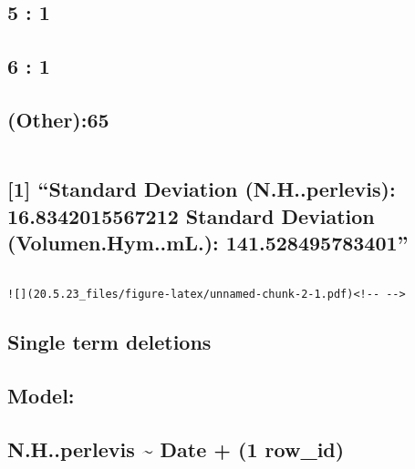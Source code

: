 \documentclass[
]{article}
\begin{document}
\hypertarget{section-3}{%
\subsection{5 : 1}\label{section-3}}

\hypertarget{section-4}{%
\subsection{6 : 1}\label{section-4}}

\hypertarget{other65}{%
\subsection{(Other):65}\label{other65}}

\begin{verbatim}
\end{verbatim}

\hypertarget{standard-deviation-n.h..perlevis-16.8342015567212-standard-deviation-volumen.hym..ml.-141.528495783401}{%
\subsection{{[}1{]} ``Standard Deviation (N.H..perlevis):
16.8342015567212 Standard Deviation (Volumen.Hym..mL.):
141.528495783401''}\label{standard-deviation-n.h..perlevis-16.8342015567212-standard-deviation-volumen.hym..ml.-141.528495783401}}

\begin{verbatim}

![](20.5.23_files/figure-latex/unnamed-chunk-2-1.pdf)<!-- --> 
\end{verbatim}

\hypertarget{single-term-deletions}{%
\subsection{Single term deletions}\label{single-term-deletions}}

\hypertarget{section-5}{%
\subsection{}\label{section-5}}

\hypertarget{model}{%
\subsection{Model:}\label{model}}

\hypertarget{n.h..perlevis-date-1-row_id}{%
\subsection{N.H..perlevis \textasciitilde{} Date + (1 \textbar{}
row\_id)}\label{n.h..perlevis-date-1-row_id}}
\end{document}
